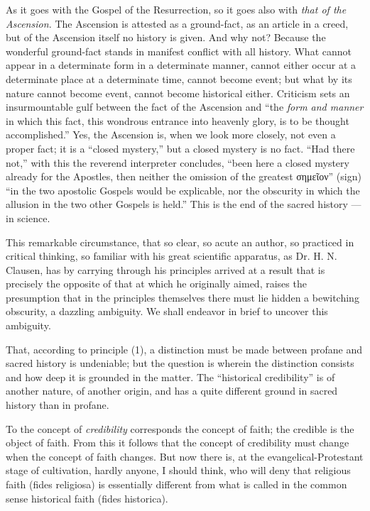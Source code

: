 \documentclass[12pt,a4paper,openany]{book}
\newcommand{\opage}[1]{\marginnote{\footnotesize\textit{[#1]}}}
\begin{document}
As it goes with the Gospel of the Resurrection, so it goes
also with \emph{that of the Ascension.} The Ascension is attested
as a ground-fact, as an article in a creed,
but of the Ascension itself no history is given.
And why not? Because the wonderful
ground-fact stands in manifest conflict with all history.
What cannot appear in a determinate form in
a determinate manner, cannot either occur at a determinate
place at a determinate time, cannot become event;
but what by its nature cannot become event,
\setcounter{footnote}{0}%
\opage{313}cannot become historical either. Criticism sets an
insurmountable gulf between the fact of the Ascension and
``the \emph{form and manner} in which this fact, this
wondrous entrance into heavenly glory, is to be
thought accomplished.'' Yes, the Ascension is, when we look
more closely, not even a proper fact; it is
a ``closed mystery,'' but a closed mystery is
no fact. ``Had there not,'' with this the reverend
interpreter concludes, ``been here a closed
mystery already for the Apostles, then neither the omission
of the greatest σημεῖον'' (sign) ``in the two
apostolic Gospels would be explicable, nor the obscurity
in which the allusion in the two other Gospels
is held.'' This is the end of the sacred history
--- in science.

This remarkable circumstance, that so clear, so acute an author,
so practiced in critical thinking, so familiar with his great scientific
apparatus, as Dr. H.
N. Clausen, has by carrying through his principles
arrived at a result that is precisely the opposite of
that at which he originally aimed, raises the presumption
that in the principles themselves there must lie hidden
a bewitching obscurity, a dazzling ambiguity.
We shall endeavor in brief to uncover this
ambiguity.

That, according to principle (1), a distinction must be made
between profane and sacred history is undeniable;
but the question is wherein the distinction consists and how
deep it is grounded in the matter. The ``historical credibility''
is of another nature, of another origin, and has a   %
quite different ground in sacred history than in profane.

\setcounter{footnote}{0}%
\opage{314}To the concept of \emph{credibility} corresponds the concept of faith;
the credible is the object of faith. From this it follows that
the concept of credibility must change when the concept of faith
changes. But now there is, at the evangelical-Protestant
stage of cultivation, hardly anyone, I should think, who will
deny that religious faith (fides religiosa) is essentially
different from what is called in the common sense
historical faith (fides historica).
\end{document}
